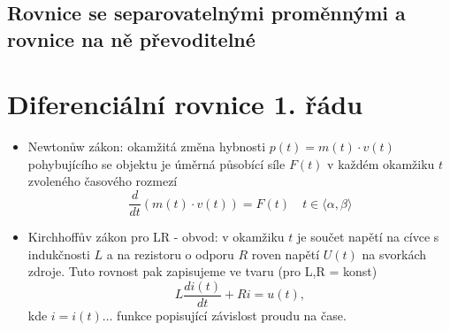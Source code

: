       
      \subsection{Rovnice se separovatelnými proměnnými a 
                  rovnice na ně převoditelné}\label{mai:IIchapIVsecIIIssecI}
        
    
      
  \section{Diferenciální rovnice 1. řádu}

    \begin{itemize}
   	  \item Newtonůw zákon: okamžitá změna hybnosti $p(t) = m(t)\cdot v(t)$ pohybujícího se
            objektu je úměrná působící síle $F(t)$ v každém okamžiku $t$ zvoleného časového rozmezí
            $$\frac{d}{dt}\left(m(t)\cdot v(t)\right) = F(t)\quad t\in\langle\alpha, \beta\rangle$$
      \item Kirchhoffův zákon pro LR - obvod: v okamžiku $t$ je součet napětí na cívce s indukčnosti
            $L$ a na rezistoru o odporu $R$ roven napětí $U(t)$ na svorkách zdroje. Tuto rovnost pak
            zapisujeme ve tvaru (pro L,R = konst)
            \begin{equation}
              L\frac{di(t)}{dt}+Ri=u(t), 
            \end{equation}
            kde $i=i(t)\ldots$ funkce popisující závislost proudu na čase.
    \end{itemize}
    

